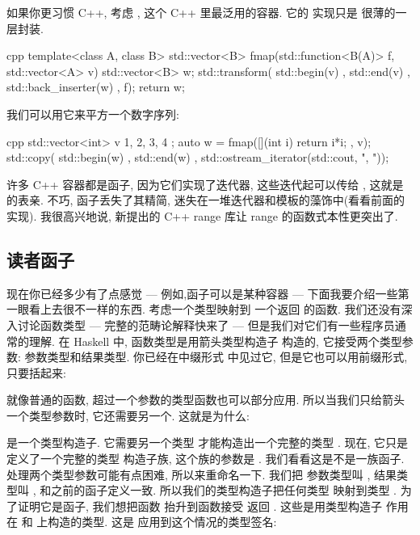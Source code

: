 如果你更习惯 C++, 考虑 , 这个 C++ 里最泛用的容器. 它的  实现只是 
很薄的一层封装.

\begin{snip}{cpp}
template<class A, class B>
std::vector<B> fmap(std::function<B(A)> f, std::vector<A> v) {
    std::vector<B> w;
    std::transform( std::begin(v)
                  , std::end(v)
                  , std::back_inserter(w)
                  , f);
    return w;
}
\end{snip}
我们可以用它来平方一个数字序列:

\begin{snip}{cpp}
std::vector<int> v{ 1, 2, 3, 4 };
auto w = fmap([](int i) { return i*i; }, v);
std::copy( std::begin(w)
         , std::end(w)
         , std::ostream_iterator(std::cout, ", "));
\end{snip}
许多 C++ 容器都是函子, 因为它们实现了迭代器, 这些迭代起可以传给 , 这就是  的表亲.
不巧, 函子丢失了其精简, 迷失在一堆迭代器和模板的藻饰中(看看前面的  实现). 我很高兴地说, 新提出的 C++ range
库让 range 的函数式本性更突出了.

\subsection{读者函子}

现在你已经多少有了点感觉 --- 例如,函子可以是某种容器 --- 下面我要介绍一些第一眼看上去很不一样的东西. 考虑一个类型映射到
一个返回  的函数. 我们还没有深入讨论函数类型 --- 完整的范畴论解释快来了 --- 但是我们对它们有一些程序员通常的理解.
在 Haskell 中, 函数类型是用箭头类型构造子 \code{(->)} 构造的, 它接受两个类型参数: 参数类型和结果类型. 你已经在中缀形式
 中见过它, 但是它也可以用前缀形式, 只要括起来:

就像普通的函数, 超过一个参数的类型函数也可以部分应用. 所以当我们只给箭头一个类型参数时, 它还需要另一个. 这就是为什么:

是一个类型构造子. 它需要另一个类型  才能构造出一个完整的类型 . 现在, 它只是定义了一个完整的类型
构造子族, 这个族的参数是 . 我们看看这是不是一族函子. 处理两个类型参数可能有点困难, 所以来重命名一下. 我们把
参数类型叫 , 结果类型叫 , 和之前的函子定义一致. 所以我们的类型构造子把任何类型  映射到类型
. 为了证明它是函子, 我们想把函数  抬升到函数接受  返回 .
这些是用类型构造子  作用在  和  上构造的类型. 这是  应用到这个情况的类型签名:

